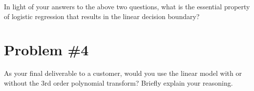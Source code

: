 \documentclass[12pt]{article}
\begin{document}
	In light of your answers to the above two questions, what is the essential property of logistic regression that results in the linear decision boundary?
	
	\section*{Problem \#4}
	As your final deliverable to a customer, would you use the linear model with or without the 3rd order polynomial transform? Briefly explain your reasoning.
	
\end{document}
